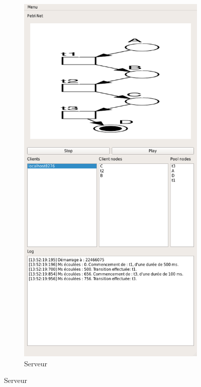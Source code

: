 	\begin{figure}
		\centering
		\begin{subfigure}{0.5\textwidth}
			\centering
			\includegraphics[scale=0.3]{images/resultats/server_simple_wifi.png}
			\caption{Serveur}
		\end{subfigure}
		

\end{figure}
